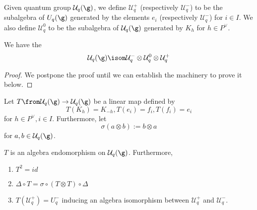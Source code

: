 \documentclass[11pt,leqno,oneside]{amsart}
\numberwithin{thm}{section}
\newcommand{\weightlattice}{P}
\newcommand{\U}{\mathcal{U}}
\begin{document}
\begin{defn}
  Given quantum group \(\U_q(\g)\), we define \(\U_q^+\) (respectively
  \(\U_q^-\)) to be the
  subalgebra of \(U_q(\g)\) generated by the elements \(e_i\)
  (respectively \(\U_q^-\)) for \(i \in I\). We also define \(\U_q^0\)
  to be the subalgebra of \(\U_q(\g)\) generated by \(K_h\) for \(h
  \in \weightlattice^\vee\). 
\end{defn}
\begin{thm}\label{triangular-decomp}
  We have the  \[
    \U_q(\g) \isom \U_q^- \otimes \U_q^0 \otimes \U_q^+
  \]
\end{thm}
\begin{proof}
  We postpone the proof until we can establish the machinery to prove
  it below.
\end{proof}
\begin{defn}
  Let \(T \from \U_q(\g) \to \U_q(\g)\) be a linear map defined by \[
    T(K_h) = K_{-h}, T(e_i) = f_i, T(f_i) = e_i
  \]
  for \(h \in \weightlattice^\vee, i \in I\). Furthermore, let \[
    \sigma(a \otimes b) := b \otimes a
  \]
  for \(a,b \in \U_q(\g)\).
\end{defn}
\begin{prop}
  \(T\) is an algebra endomorphism on \(\U_q(\g)\). Furthermore,
  \begin{enumerate}
  \item \(T^2 = id\)
  \item \(\Delta \circ T = \sigma \circ (T \otimes T) \circ \Delta\)
  \item \(T(\U_q^+) = U_q^-\) inducing an algebra isomorphism between
    \(\U_q^+\) and \(\U_q^-\).
  \end{enumerate}
\end{prop}
\end{document}

